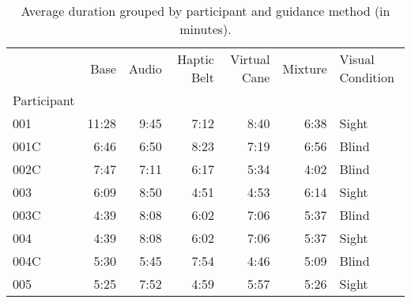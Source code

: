 
\begin{table}[!htb]
\centering
\caption{Average duration grouped by participant and guidance method (in minutes).}
\label{tab:duracao_average_scene}
\begin{tabular}{lrrrrrl}
\toprule
{} &   Base & Audio & Haptic Belt & Virtual Cane & Mixture & Visual Condition \\
Participant &        &       &             &              &         &                  \\
\midrule
001         &  11:28 &  9:45 &        7:12 &         8:40 &    6:38 &            Sight \\
001C        &   6:46 &  6:50 &        8:23 &         7:19 &    6:56 &            Blind \\
002C        &   7:47 &  7:11 &        6:17 &         5:34 &    4:02 &            Blind \\
003         &   6:09 &  8:50 &        4:51 &         4:53 &    6:14 &            Sight \\
003C        &   4:39 &  8:08 &        6:02 &         7:06 &    5:37 &            Blind \\
004         &   4:39 &  8:08 &        6:02 &         7:06 &    5:37 &            Sight \\
004C        &   5:30 &  5:45 &        7:54 &         4:46 &    5:09 &            Blind \\
005         &   5:25 &  7:52 &        4:59 &         5:57 &    5:26 &            Sight \\
\bottomrule
\end{tabular}
\end{table}

